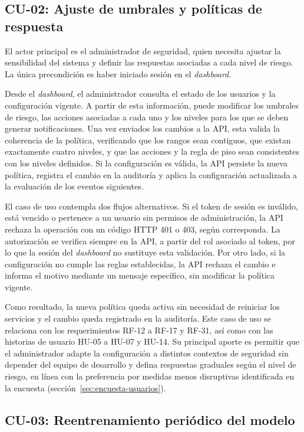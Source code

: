 \subsection{CU-02: Ajuste de umbrales y políticas de respuesta}
\label{sec:cu02}

El actor principal es el administrador de seguridad, quien necesita ajustar la sensibilidad del sistema y definir las respuestas asociadas a cada nivel de riesgo. La única precondición es haber iniciado sesión en el \emph{dashboard}.

Desde el \emph{dashboard}, el administrador consulta el estado de los usuarios y la configuración vigente. A partir de esta información, puede modificar los umbrales de riesgo, las acciones asociadas a cada uno y los niveles para los que se deben generar notificaciones. Una vez enviados los cambios a la API, esta valida la coherencia de la política, verificando que los rangos sean contiguos, que existan exactamente cuatro niveles, y que las acciones y la regla de piso sean consistentes con los niveles definidos. Si la configuración es válida, la API persiste la nueva política, registra el cambio en la auditoría y aplica la configuración actualizada a la evaluación de los eventos siguientes.

El caso de uso contempla dos flujos alternativos. Si el token de sesión es inválido, está vencido o pertenece a un usuario sin permisos de administración, la API rechaza la operación con un código HTTP 401 o 403, según corresponda. La autorización se verifica siempre en la API, a partir del rol asociado al token, por lo que la sesión del \emph{dashboard} no sustituye esta validación. Por otro lado, si la configuración no cumple las reglas establecidas, la API rechaza el cambio e informa el motivo mediante un mensaje específico, sin modificar la política vigente.

Como resultado, la nueva política queda activa sin necesidad de reiniciar los servicios y el cambio queda registrado en la auditoría. Este caso de uso se relaciona con los requerimientos RF-12 a RF-17 y RF-31, así como con las historias de usuario HU-05 a HU-07 y HU-14. Su principal aporte es permitir que el administrador adapte la configuración a distintos contextos de seguridad sin depender del equipo de desarrollo y defina respuestas graduales según el nivel de riesgo, en línea con la preferencia por medidas menos disruptivas identificada en la encuesta (sección~\ref{sec:encuesta-usuarios}).

\subsection{CU-03: Reentrenamiento periódico del modelo}
\label{sec:cu03}

